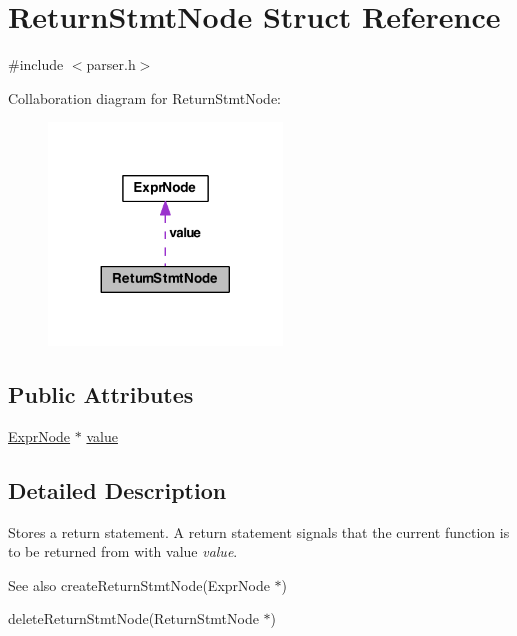 \hypertarget{struct_return_stmt_node}{\section{Return\-Stmt\-Node Struct Reference}
\label{struct_return_stmt_node}
}


{\ttfamily \#include $<$parser.\-h$>$}



Collaboration diagram for Return\-Stmt\-Node\-:
\nopagebreak
\begin{figure}[H]
\begin{center}
\leavevmode
\includegraphics[width=176pt]{struct_return_stmt_node__coll__graph}
\end{center}
\end{figure}
\subsection*{Public Attributes}
\begin{DoxyCompactItemize}
\item 
\hyperlink{struct_expr_node}{Expr\-Node} $\ast$ \hyperlink{struct_return_stmt_node_ac610b54406ae3bc54e3d5c4e9fcb1d2e}{value}
\end{DoxyCompactItemize}


\subsection{Detailed Description}
Stores a return statement. A return statement signals that the current function is to be returned from with value {\itshape value\/}.

\begin{DoxySeeAlso}{See also}
create\-Return\-Stmt\-Node(\-Expr\-Node $\ast$) 

delete\-Return\-Stmt\-Node(\-Return\-Stmt\-Node $\ast$) 
\end{DoxySeeAlso}


